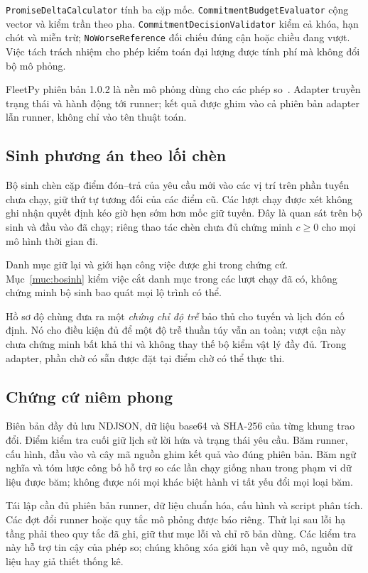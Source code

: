 \texttt{PromiseDeltaCalculator} tính ba cặp mốc. \texttt{CommitmentBudgetEvaluator} cộng
vector và kiểm trần theo pha. \texttt{CommitmentDecisionValidator} kiểm cả khóa, hạn chót
và miễn trừ; \texttt{NoWorseReference} đối chiếu đúng cận hoặc chiều đang vượt. Việc tách
trách nhiệm cho phép kiểm toán đại lượng được tính phí mà không đổi bộ mô phỏng.

FleetPy phiên bản 1.0.2 là nền mô phỏng dùng cho các phép so~\cite{fleetpy2022}. Adapter
truyền trạng thái và hành động tới runner; kết quả được ghim vào cả phiên bản adapter lẫn
runner, không chỉ vào tên thuật toán.

\subsection{Sinh phương án theo lối chèn}

Bộ sinh chèn cặp điểm đón--trả của yêu cầu mới vào các vị trí trên phần tuyến chưa chạy,
giữ thứ tự tương đối của các điểm cũ. Các lượt chạy được xét không ghi nhận quyết định
kéo giờ hẹn sớm hơn mốc giữ tuyến. Đây là quan sát trên bộ sinh và đầu vào đã chạy; riêng
thao tác chèn chưa đủ chứng minh $c\ge0$ cho mọi mô hình thời gian đi.

Danh mục giữ lại và giới hạn công việc được ghi trong chứng cứ. Mục~\ref{muc:bosinh}
kiểm việc cắt danh mục trong các lượt chạy đã có, không chứng minh bộ sinh bao quát mọi
lộ trình có thể.

Hồ sơ độ chùng đưa ra một \emph{chứng chỉ độ trễ} bảo thủ cho tuyến và lịch đón cố định.
Nó cho điều kiện đủ để một độ trễ thuần túy vẫn an toàn; vượt cận này chưa chứng minh bất
khả thi và không thay thế bộ kiểm vật lý đầy đủ. Trong adapter, phần chờ có sẵn được đặt
tại điểm chờ có thể thực thi.

\subsection{Chứng cứ niêm phong}

Biên bản đầy đủ lưu NDJSON, dữ liệu base64 và SHA-256 của từng khung trao đổi. Điểm kiểm tra
cuối giữ lịch sử lời hứa và trạng thái yêu cầu. Băm runner, cấu hình, đầu vào và cây mã nguồn
ghim kết quả vào đúng phiên bản. Băm ngữ nghĩa và tóm lược công bố hỗ trợ so các lần chạy
giống nhau trong phạm vi dữ liệu được băm; không được nói mọi khác biệt hành vi tất yếu đổi
mọi loại băm.

Tái lập cần đủ phiên bản runner, dữ liệu chuẩn hóa, cấu hình và script phân tích. Các đợt
đổi runner hoặc quy tắc mô phỏng được báo riêng. Thử lại sau lỗi hạ tầng phải theo quy tắc
đã ghi, giữ thư mục lỗi và chỉ rõ bản dùng. Các kiểm tra này hỗ trợ tin cậy của phép so;
chúng không xóa giới hạn về quy mô, nguồn dữ liệu hay giả thiết thống kê.
